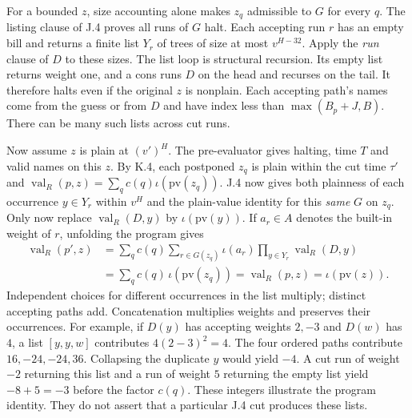 For a bounded $z$, size accounting alone makes $z_q$ admissible to $G$ for every $q$. The listing clause of J.4 proves all runs of $G$ halt. Each accepting run $r$ has an empty bill and returns a finite list $Y_r$ of trees of size at most $v^{H-32}$. Apply the \emph{run} clause of $D$ to these sizes. The list loop is structural recursion. Its empty list returns weight one, and a cons runs $D$ on the head and recurses on the tail. It therefore halts even if the original $z$ is nonplain. Each accepting path's names come from the guess or from $D$ and have index less than $\max(B_p+J,B)$. There can be many such lists across cut runs.

Now assume $z$ is plain at $(v')^H$. The pre-evaluator gives halting, time $T$ and valid names on this $z$. By K.4, each postponed $z_q$ is plain within the cut time $\tau'$ and
$\operatorname{val}_R(p,z)=\sum_q c(q)\iota(\mathrm{pv}(z_q))$.
J.4 now gives both plainness of each occurrence $y\in Y_r$ within $v^H$ and the plain-value identity for this \emph{same} $G$ on $z_q$. Only now replace $\operatorname{val}_R(D,y)$ by $\iota(\mathrm{pv}(y))$. If $a_r\in A$ denotes the built-in weight of $r$, unfolding the program gives
\[
 \begin{aligned}
 \operatorname{val}_R(p',z)
 &=\sum_q c(q)\sum_{r\in G(z_q)}\iota(a_r)
                    \prod_{y\in Y_r}\operatorname{val}_R(D,y)\\
 &=\sum_q c(q)\,\iota(\mathrm{pv}(z_q))
   =\operatorname{val}_R(p,z)=\iota(\mathrm{pv}(z)).
 \end{aligned}
\]
Independent choices for different occurrences in the list multiply; distinct accepting paths add. Concatenation multiplies weights and preserves their occurrences. For example, if $D(y)$ has accepting weights $2,-3$ and $D(w)$ has $4$, a list $[y,y,w]$ contributes $4(2-3)^2=4$. The four ordered paths contribute $16,-24,-24,36$. Collapsing the duplicate $y$ would yield $-4$. A cut run of weight $-2$ returning this list and a run of weight $5$ returning the empty list yield $-8+5=-3$ before the factor $c(q)$. These integers illustrate the program identity. They do not assert that a particular J.4 cut produces these lists.

